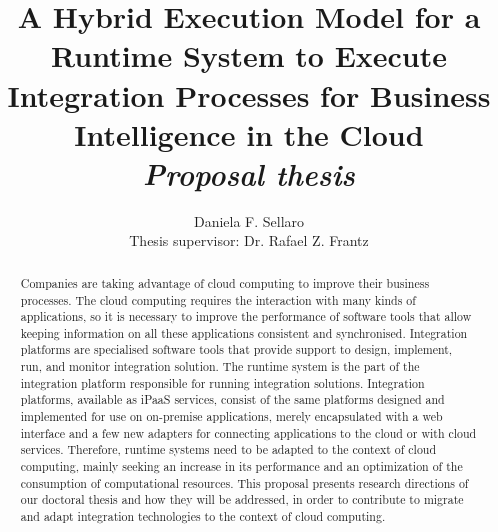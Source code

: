 \documentclass[11pt]{article}
\title{\textbf{A Hybrid Execution Model for a Runtime System to Execute Integration Processes for Business Intelligence in the Cloud} \\ \textit{Proposal thesis}}
\author{Daniela F. Sellaro \\ Thesis supervisor: Dr. Rafael Z. Frantz}
\begin{document}
\lstset{language=C++,basicstyle=\small,
        stringstyle=\ttfamily,showstringspaces=false}


\singlespace
\maketitle

\begin{abstract}                %
Companies are taking advantage of cloud computing to improve their business processes. The cloud computing requires the interaction with many kinds of applications, so it is necessary to improve the performance of software tools that allow keeping information on all these applications consistent and synchronised. Integration platforms are specialised software tools that provide support to design, implement, run, and monitor integration solution. The runtime system is the part of the integration platform responsible for running integration solutions.
Integration platforms, available as iPaaS services, consist of the same platforms designed and implemented for use on on-premise applications, merely encapsulated with a web interface and a few new adapters for connecting applications to the cloud or with cloud services. Therefore, runtime systems need to be adapted to the context of cloud computing, mainly seeking an increase in its performance and an optimization of the consumption of computational resources. 
This proposal presents research directions of our doctoral thesis and how they will be addressed, in order to contribute to migrate and adapt integration technologies to the context of cloud computing.

\end{abstract}
%
\setcounter{secnumdepth}{3}
%
\doublespace
%

\doublespace

\doublespace

\end{document}
